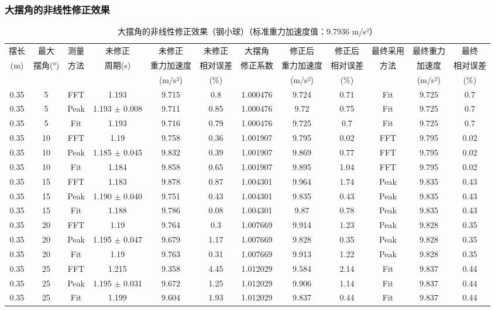 \documentclass[lang=cn,a4paper,newtx,bibstyle=gb7714-2015]{elegantpaper}
\newcommand{\threelinetablestyle}{%
  \renewcommand{\arraystretch}{1.2}%
  \setlength{\tabcolsep}{3.5pt}%
  \small%
}
\numberwithin{equation}{section} %
\begin{document}
\subsubsection{大摆角的非线性修正效果}
\begin{table}[H]
\centering
\threelinetablestyle
\caption{大摆角的非线性修正效果（钢小球）（标准重力加速度值：9.7936 m/s²）}
\setlength{\tabcolsep}{2pt}
\footnotesize
\begin{tabular}{cccccccccccc}
\toprule
摆长 & 最大 & 测量 & 未修正 & 未修正 & 未修正 & 大摆角 & 修正后 & 修正后 & 最终采用 & 最终重力 & 最终 \\
(m) & 摆角(°) & 方法 & 周期(s) & 重力加速度 & 相对误差 & 修正系数 & 重力加速度 & 相对误差 & 方法 & 加速度 & 相对误差 \\
 & & & & (m/s²) & (\%) & & (m/s²) & (\%) & & (m/s²) & (\%) \\
\midrule
0.35 & 5 & FFT & 1.193 & 9.715 & 0.8 & 1.000476 & 9.724 & 0.71 & Fit & 9.725 & 0.7 \\
0.35 & 5 & Peak & 1.193 $\pm$ 0.008 & 9.711 & 0.85 & 1.000476 & 9.72 & 0.75 & Fit & 9.725 & 0.7 \\
0.35 & 5 & Fit & 1.193 & 9.716 & 0.79 & 1.000476 & 9.725 & 0.7 & Fit & 9.725 & 0.7 \\
0.35 & 10 & FFT & 1.19 & 9.758 & 0.36 & 1.001907 & 9.795 & 0.02 & FFT & 9.795 & 0.02 \\
0.35 & 10 & Peak & 1.185 $\pm$ 0.045 & 9.832 & 0.39 & 1.001907 & 9.869 & 0.77 & FFT & 9.795 & 0.02 \\
0.35 & 10 & Fit & 1.184 & 9.858 & 0.65 & 1.001907 & 9.895 & 1.04 & FFT & 9.795 & 0.02 \\
0.35 & 15 & FFT & 1.183 & 9.878 & 0.87 & 1.004301 & 9.964 & 1.74 & Peak & 9.835 & 0.43 \\
0.35 & 15 & Peak & 1.190 $\pm$ 0.040 & 9.751 & 0.43 & 1.004301 & 9.835 & 0.43 & Peak & 9.835 & 0.43 \\
0.35 & 15 & Fit & 1.188 & 9.786 & 0.08 & 1.004301 & 9.87 & 0.78 & Peak & 9.835 & 0.43 \\
0.35 & 20 & FFT & 1.19 & 9.764 & 0.3 & 1.007669 & 9.914 & 1.23 & Peak & 9.828 & 0.35 \\
0.35 & 20 & Peak & 1.195 $\pm$ 0.047 & 9.679 & 1.17 & 1.007669 & 9.828 & 0.35 & Peak & 9.828 & 0.35 \\
0.35 & 20 & Fit & 1.19 & 9.763 & 0.31 & 1.007669 & 9.913 & 1.22 & Peak & 9.828 & 0.35 \\
0.35 & 25 & FFT & 1.215 & 9.358 & 4.45 & 1.012029 & 9.584 & 2.14 & Fit & 9.837 & 0.44 \\
0.35 & 25 & Peak & 1.195 $\pm$ 0.031 & 9.672 & 1.25 & 1.012029 & 9.906 & 1.14 & Fit & 9.837 & 0.44 \\
0.35 & 25 & Fit & 1.199 & 9.604 & 1.93 & 1.012029 & 9.837 & 0.44 & Fit & 9.837 & 0.44 \\
\bottomrule
\end{tabular}
\label{tab:large_angle_correction}
\end{table}
\label{app:large_angle_correction}
\end{document}
